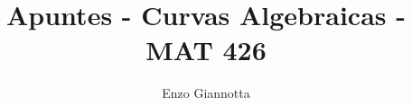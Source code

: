 \documentclass[12pt]{article}
\title{Apuntes - Curvas Algebraicas - MAT 426}
\author{Enzo Giannotta}
\theoremstyle{customTheorem}
\theoremstyle{customDefinition}
\newcommand{\fiveknot}{%
\begin{tikzpicture}[transform canvas={scale=0.1}]
\begin{knot}[
  consider self intersections=true,
  flip crossing/.list={2,4},
  only when rendering/.style={
  }
]
\strand[black, line width=8pt] (2,0) .. controls +(0,1) and +(54:1.0) .. (144:2) .. controls +(54:-1.0) and +(18:-1.0) .. (-72:2) .. controls +(18:1.0) and +(162:-1.0) .. (72:2) .. controls +(162:1.0) and +(126:1.0) .. (-144:2) .. controls +(126:-1.0) and +(0,-1.0) .. (2,0);
\end{knot}
\end{tikzpicture}
}
\begin{document}
\renewcommand{\qedsymbol}{\fiveknot}

\maketitle


\tableofcontents

























\newpage


{}
\end{document}
